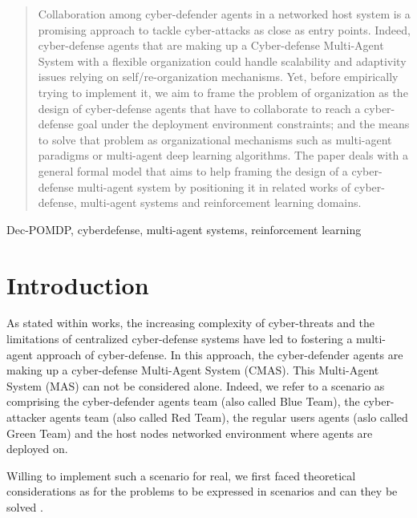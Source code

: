 \documentclass[conference]{IEEEtran}
\begin{document}
\maketitle

\begin{abstract}

Collaboration among cyber-defender agents in a networked host system is a promising approach to tackle cyber-attacks as close as entry points. Indeed, cyber-defense agents that are making up a Cyber-defense Multi-Agent System with a flexible organization could handle scalability and adaptivity issues relying on self/re-organization mechanisms. Yet, before empirically trying to implement it, we aim to frame the problem of organization as the design of cyber-defense agents that have to collaborate to reach a cyber-defense goal under the deployment environment constraints; and the means to solve that problem as organizational mechanisms such as multi-agent paradigms or multi-agent deep learning algorithms.
The paper deals with a general formal model that aims to help framing the design of a cyber-defense multi-agent system by positioning it in related works of cyber-defense, multi-agent systems and reinforcement learning domains.

\end{abstract}

\begin{IEEEkeywords}
Dec-POMDP, cyberdefense, multi-agent systems, reinforcement learning
\end{IEEEkeywords}

\section{Introduction}

As stated within  works\cite{kott2023autonomous}, the increasing complexity of cyber-threats and the limitations of centralized cyber-defense systems have led to fostering a multi-agent approach of cyber-defense. In this approach, the cyber-defender agents are making up a cyber-defense Multi-Agent System (CMAS). This Multi-Agent System (MAS) can not be considered alone. Indeed, we refer to a scenario as comprising the cyber-defender agents team (also called Blue Team), the cyber-attacker agents team (also called Red Team), the regular users agents (aslo called Green Team) and the host nodes networked environment where agents are deployed on.

Willing to implement such a scenario for real, we first faced theoretical considerations as for the problems to be expressed in scenarios and can they be solved .
\end{document}
